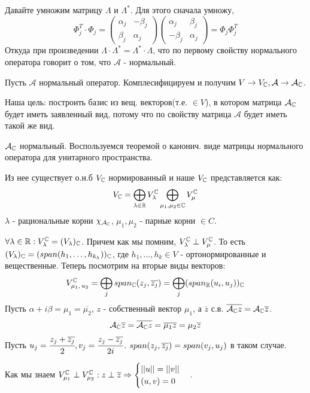 Давайте умножим матрицу $\Lambda$ и $\Lambda^*$. Для этого сначала умножу, $$\Phi_j^T \cdot \Phi_j = \begin{pmatrix}
    \alpha_j &-\beta_j\\
    \beta_j & \alpha_j
\end{pmatrix} \begin{pmatrix}
    \alpha_j & \beta_j \\
    -\beta_j & \alpha_j
\end{pmatrix} = \Phi_j \Phi_j^T$$ Откуда при произведении $\Lambda \cdot \Lambda^* = \Lambda^* \cdot \Lambda$, что по первому свойству нормального оператора говорит о том, что $\mathcal{A}$ - нормальный.


Пусть $\mathcal{A}$ нормальный оператор. Комплесифицируем и получим $V \rightarrow{} V_{\mathbb{C}}, \mathcal{A}\rightarrow{} \mathcal{A}_{\mathbb{C}}$.  

Наша цель: построить базис из вещ. векторов(т.е. $\in V$), в котором матрица $\mathcal{A}_{\mathbb{C}}$ будет иметь заявленный вид, потому что по свойству матрица $\mathcal{A}$ будет иметь такой же вид.

$\mathcal{A}_{\mathbb{C}}$ нормальный. Воспользуемся теоремой о канонич. виде матрицы нормального оператора для унитарного пространства.

Из нее существует о.н.б $V_{\mathbb{C}}$ нормированный и наше $V_{\mathbb{C}}$ представляется как:
$$V_{\mathbb{C}} = \bigoplus\limits_{\lambda \in \mathbb{R}} V_\lambda^{\mathbb{C}}\bigoplus\limits_{\mu_1,\mu_2 \in \mathbb{C}}V_\mu^{\mathbb{C}}$$
$\lambda$ - рациональные корни $\chi_{\mathcal{A}_{\mathbb{C}}}$, $\mu_1,\mu_2$ - парные корни $\in C$.

$\forall \lambda \in \mathbb{R}: V_\lambda^{\mathbb{C}} = (V_\lambda)_{\mathbb{C}}$. Причем как мы помним, $V_\lambda^{\mathbb{C}} \perp V_\mu^{\mathbb{C}}$. То есть $(V_\lambda)_{\mathbb{C}} = (span(h_1,\ldots,h_{k_\lambda}))_{\mathbb{C}}$, где $h_1,\ldots,h_k  \in V$ - ортонормированные и вещественные. Теперь посмотрим на вторые виды векторов:
$$V_{\mu_1,\,u_2}^{\mathbb{C}} = \bigoplus\limits_j span_{\mathbb{C}} (z_j, \overline{z_j}) = \bigoplus\limits_j(span_{\mathbb{R}}(u_i,u_j))_{\mathbb{C}}$$
Пусть $\alpha + i\beta = \mu_1 = \overline{\mu_2}$, $z$ - собственный вектор $\mu_1$, а $\overline{z}$ с.в.  $\overline{\mathcal{A}_{\mathbb{C}} z} = \mathcal{A}_{\mathbb{C}} \overline{z}$.
$$\mathcal{A}_{\mathbb{C}} \overline{z} = \overline{\mathcal{A}_{\mathbb{C}} z} = \overline{\mu_1 z} = \mu_2\overline{z}$$
Пусть $u_j =\cfrac{z_j + \overline{z_j}}{2}, v_j = \cfrac{z_j -\overline{z_j}}{2i}$. $span (z_j, \overline{z_j}) = span(v_j,u_j)$ в таком случае.

Как мы знаем $V_{\mu_1}^{\mathbb{C}}\perp V_{\mu_2}^{\mathbb{C}}: z \perp \overline{z} \Rightarrow \begin{cases}
    ||u || = ||v||\\
    (u,v) = 0
\end{cases}$.

